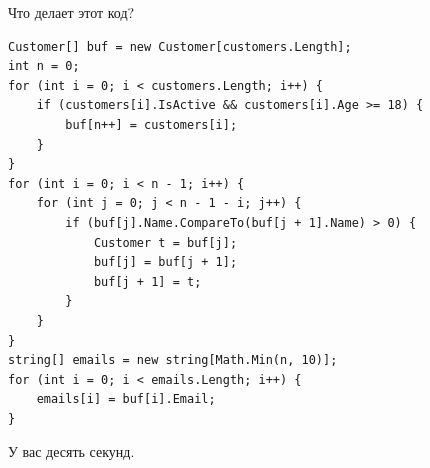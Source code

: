 \documentclass[aspectratio=169,10pt,t]{beamer}
\begin{document}
\begin{frame}[fragile]{Что делает этот код?}
  \slidetop
  \begin{minipage}[t]{0.6\textwidth}
\begin{lstlisting}[style=csharp,basicstyle=\ttfamily\scriptsize]
Customer[] buf = new Customer[customers.Length];
int n = 0;
for (int i = 0; i < customers.Length; i++) {
    if (customers[i].IsActive && customers[i].Age >= 18) {
        buf[n++] = customers[i];
    }
}
for (int i = 0; i < n - 1; i++) {
    for (int j = 0; j < n - 1 - i; j++) {
        if (buf[j].Name.CompareTo(buf[j + 1].Name) > 0) {
            Customer t = buf[j];
            buf[j] = buf[j + 1];
            buf[j + 1] = t;
        }
    }
}
string[] emails = new string[Math.Min(n, 10)];
for (int i = 0; i < emails.Length; i++) {
    emails[i] = buf[i].Email;
}
\end{lstlisting}
  \end{minipage}\hfill
  \begin{minipage}[t]{0.36\textwidth}
    \vspace{0.6em}
    \par
    \vspace{0.6em}
    {\Large\dncnohyph У вас десять секунд.\par}
    \vspace{1.4em}
  \end{minipage}
\end{frame}
\end{document}
